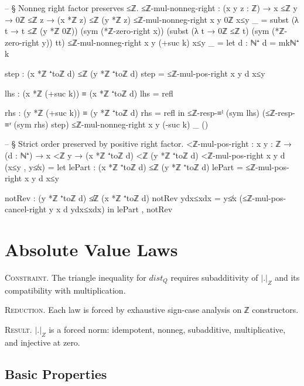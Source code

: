 \documentclass[11pt,a4paper]{book}
\def\cdot{.}%
\def\mathrm#1{#1}%
\def\mathbb#1{#1}%
\begin{document}
\begin{code}
-- § Nonneg right factor preserves ≤ℤ.
≤ℤ-mul-nonneg-right : (x y z : ℤ) → x ≤ℤ y → 0ℤ ≤ℤ z → (x *ℤ z) ≤ℤ (y *ℤ z)
≤ℤ-mul-nonneg-right x y 0ℤ x≤y _ =
  subst (λ t → t ≤ℤ (y *ℤ 0ℤ)) (sym (*ℤ-zero-right x))
    (subst (λ t → 0ℤ ≤ℤ t) (sym (*ℤ-zero-right y)) tt)
≤ℤ-mul-nonneg-right x y (+suc k) x≤y _ =
  let
    d : ℕ⁺
    d = mkℕ⁺ k

    step : (x *ℤ ⁺toℤ d) ≤ℤ (y *ℤ ⁺toℤ d)
    step = ≤ℤ-mul-pos-right x y d x≤y

    lhs : (x *ℤ (+suc k)) ≡ (x *ℤ ⁺toℤ d)
    lhs = refl

    rhs : (y *ℤ (+suc k)) ≡ (y *ℤ ⁺toℤ d)
    rhs = refl
  in
  ≤ℤ-resp-≡ˡ (sym lhs) (≤ℤ-resp-≡ʳ (sym rhs) step)
≤ℤ-mul-nonneg-right x y (-suc k) _ ()

-- § Strict order preserved by positive right factor.
<ℤ-mul-pos-right : {x y : ℤ} → (d : ℕ⁺) → x <ℤ y → (x *ℤ ⁺toℤ d) <ℤ (y *ℤ ⁺toℤ d)
<ℤ-mul-pos-right {x} {y} d (x≤y , y≰x) =
  let
    lePart : (x *ℤ ⁺toℤ d) ≤ℤ (y *ℤ ⁺toℤ d)
    lePart = ≤ℤ-mul-pos-right x y d x≤y

    notRev : (y *ℤ ⁺toℤ d) ≰ℤ (x *ℤ ⁺toℤ d)
    notRev ydx≤xdx = y≰x (≤ℤ-mul-pos-cancel-right y x d ydx≤xdx)
  in
  lePart , notRev
\end{code}

\chapter{Absolute Value Laws}

\textsc{Constraint.}
The triangle inequality for $\mathrm{dist}_{\mathbb{Q}}$ requires subadditivity of
$|\cdot|_{\mathbb{Z}}$ and its compatibility with multiplication.

\textsc{Reduction.}
Each law is forced by exhaustive sign-case analysis on ℤ constructors.

\textsc{Result.}
$|\cdot|_{\mathbb{Z}}$ is a forced norm: idempotent, nonneg, subadditive, multiplicative,
and injective at zero.

\section{Basic Properties}
\end{document}
